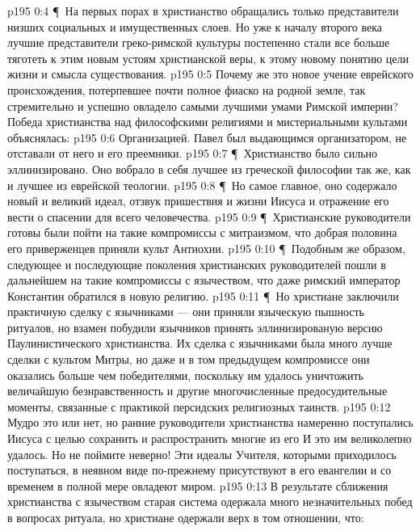 \vs p195 0:4 \P\ На первых порах в христианство обращались только представители низших социальных и имущественных слоев. Но уже к началу второго века лучшие представители греко\hyp{}римской культуры постепенно стали все больше тяготеть к этим новым устоям христианской веры, к этому новому понятию цели жизни и смысла существования.
\vs p195 0:5 Почему же это новое учение еврейского происхождения, потерпевшее почти полное фиаско на родной земле, так стремительно и успешно овладело самыми лучшими умами Римской империи? Победа христианства над философскими религиями и мистериальными культами объяснялась:
\vs p195 0:6 \bibnobreakspace Организацией. Павел был выдающимся организатором, не отставали от него и его преемники.
\vs p195 0:7 \P\ \bibnobreakspace Христианство было сильно эллинизировано. Оно вобрало в себя лучшее из греческой философии так же, как и лучшее из еврейской теологии.
\vs p195 0:8 \P\ \bibnobreakspace Но самое главное, оно содержало новый и великий идеал, отзвук пришествия и жизни Иисуса и отражение его вести о спасении для всего человечества.
\vs p195 0:9 \P\ \bibnobreakspace Христианские руководители готовы были пойти на такие компромиссы с митраизмом, что добрая половина его приверженцев приняли культ Антиохии.
\vs p195 0:10 \P\ \bibnobreakspace Подобным же образом, следующее и последующие поколения христианских руководителей пошли в дальнейшем на такие компромиссы с язычеством, что даже римский император Константин обратился в новую религию.
\vs p195 0:11 \P\ Но христиане заключили практичную сделку с язычниками --- они приняли языческую пышность ритуалов, но взамен побудили язычников принять эллинизированую версию Паулинистического христианства. Их сделка с язычниками была много лучше сделки с культом Митры, но даже и в том предыдущем компромиссе они оказались больше чем победителями, поскольку им удалось уничтожить величайшую безнравственность и другие многочисленные предосудительные моменты, связанные с практикой персидских религиозных таинств.
\vs p195 0:12 Мудро это или нет, но ранние руководители христианства намеренно поступались  Иисуса с целью сохранить и распространить многие из его  И это им великолепно удалось. Но не поймите неверно! Эти идеалы Учителя, которыми приходилось поступаться, в неявном виде по\hyp{}прежнему присутствуют в его евангелии и со временем в полной мере овладеют миром.
\vs p195 0:13 В результате сближения христианства с язычеством старая система одержала много незначительных побед в вопросах ритуала, но христиане одержали верх в том отношении, что:
